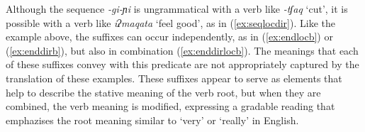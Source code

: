 \documentclass[output=paper]{langscibook}
\begin{document}
\ea {\label{ex:cutlocdir}}
\z
\z

Although the sequence \textit{-gi-ɲi} is ungrammatical with a verb like \textit{-tʃaq} `cut', it is possible with a verb like \textit{iʔmaqata} `feel good', as in (\ref{ex:seqlocdir}). Like the example above, the suffixes can occur independently, as in (\ref{ex:endlocb}) or (\ref{ex:enddirb}), but also in combination (\ref{ex:enddirlocb}). The meanings that each of these suffixes convey with this predicate are not appropriately captured by the translation of these examples. These suffixes appear to serve as elements that help to describe the stative meaning of the verb root, but when they are combined, the verb meaning is modified, expressing a gradable reading that emphazises the root meaning similar to `very' or `really' in English.   
\end{document}
